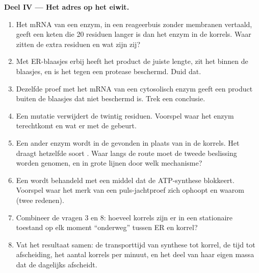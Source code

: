 \begin{problem}
\medskip
\noindent\textbf{Deel IV --- Het adres op het eiwit.}
\begin{enumerate}[resume]
  \item Het mRNA van een enzym, in een reageerbuis zonder membranen
        vertaald, geeft een keten die \qty{20}{} residuen langer is dan het
        enzym in de korrels. Waar zitten de extra residuen en wat zijn zij?
  \item Met ER-blaasjes erbij heeft het product de juiste lengte, zit het
        binnen de blaasjes, en is het tegen een protease beschermd. Duid
        dat.
  \item Dezelfde proef met het mRNA van een cytosolisch enzym geeft een
        product buiten de blaasjes dat niet beschermd is. Trek een
        conclusie.
  \item Een mutatie verwijdert de twintig residuen. Voorspel waar het enzym
        terechtkomt en wat er met de  gebeurt.
  \item Een ander enzym wordt in de  gevonden in plaats van in de
        korrels. Het draagt hetzelfde soort . Waar langs
        de route moet de tweede beslissing worden genomen, en in grote
        lijnen door welk mechanisme?
  \item Een  wordt behandeld met een middel dat de ATP-synthese
        blokkeert. Voorspel waar het merk van een puls-jachtproef zich
        ophoopt en waarom (twee redenen).
  \item Combineer de vragen 3 en 8: hoeveel korrels zijn er in een
        stationaire toestand op elk moment ``onderweg'' tussen ER en
        korrel?
  \item Vat het resultaat samen: de transporttijd van synthese tot korrel,
        de tijd tot afscheiding, het aantal korrels per minuut, en het deel
        van haar eigen massa dat de  dagelijks afscheidt.
\end{enumerate}
\end{problem}
